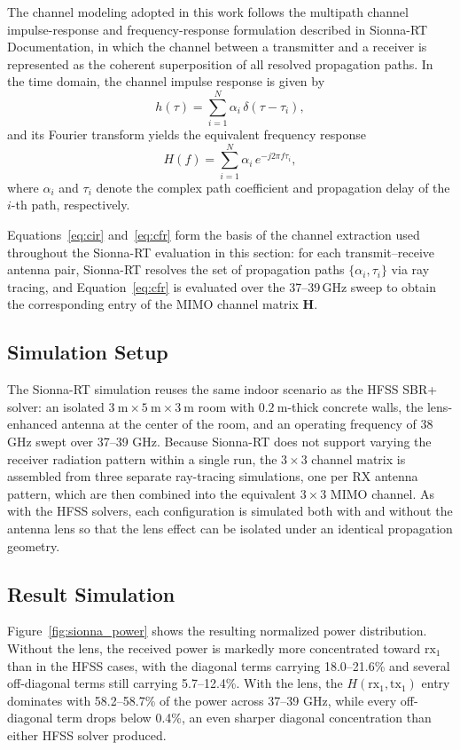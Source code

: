 The channel modeling adopted in this work follows the multipath channel impulse-response and frequency-response formulation described in Sionna-RT Documentation\cite{NVIDIACorporation2026}\cite{Tse2005}, in which the channel between a transmitter and a receiver is represented as the coherent superposition of all resolved propagation paths. In the time domain, the channel impulse response is given by
\begin{equation}
    h(\tau) = \sum_{i=1}^{N}\alpha_i\,\delta(\tau-\tau_i),
    \label{eq:cir}
\end{equation}
and its Fourier transform yields the equivalent frequency response
\begin{equation}
    H(f) = \sum_{i=1}^{N}\alpha_i\,e^{-j2\pi f\tau_i},
    \label{eq:cfr}
\end{equation}
where $\alpha_i$ and $\tau_i$ denote the complex path coefficient and propagation delay of the $i$-th path, respectively.

Equations~\ref{eq:cir} and~\ref{eq:cfr} form the basis of the channel extraction used throughout the Sionna-RT evaluation in this section: for each transmit--receive antenna pair, Sionna-RT resolves the set of propagation paths $\{\alpha_i,\tau_i\}$ via ray tracing, and Equation~\ref{eq:cfr} is evaluated over the 37--39\,GHz sweep to obtain the corresponding entry of the MIMO channel matrix $\mathbf{H}$.

\subsection{Simulation Setup}
The Sionna-RT simulation reuses the same indoor scenario as the HFSS SBR+ solver: an isolated $3~\mathrm{m}\times5~\mathrm{m}\times3~\mathrm{m}$ room with $0.2~\mathrm{m}$-thick concrete walls, the lens-enhanced antenna at the center of the room, and an operating frequency of 38 GHz swept over 37--39 GHz. Because Sionna-RT does not support varying the receiver radiation pattern within a single run, the $3\times3$ channel matrix is assembled from three separate ray-tracing simulations, one per RX antenna pattern, which are then combined into the equivalent $3\times3$ MIMO channel. As with the HFSS solvers, each configuration is simulated both with and without the antenna lens so that the lens effect can be isolated under an identical propagation geometry.

\subsection{Result Simulation}
Figure~\ref{fig:sionna_power} shows the resulting normalized power distribution. Without the lens, the received power is markedly more concentrated toward $\mathrm{rx}_1$ than in the HFSS cases, with the diagonal terms carrying 18.0--21.6\% and several off-diagonal terms still carrying 5.7--12.4\%. With the lens, the $H(\mathrm{rx}_1,\mathrm{tx}_1)$ entry dominates with 58.2--58.7\% of the power across 37--39 GHz, while every off-diagonal term drops below 0.4\%, an even sharper diagonal concentration than either HFSS solver produced.

